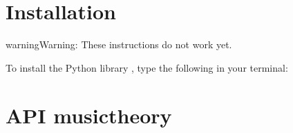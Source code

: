 \documentclass[letterpaper,10pt,english]{sphinxmanual}
\begin{document}
\cleardoublepage
\begingroup
\renewcommand\chapter[1]{\endgroup}


\chapter{Bibliography}
\label{\detokenize{8_bibliography:bibliography}}\label{\detokenize{8_bibliography::doc}}



\chapter{Developers}
\label{\detokenize{index:developers}}

\section{Installation}
\label{\detokenize{install:installation}}\label{\detokenize{install::doc}}
\begin{sphinxadmonition}{warning}{Warning:}
These instructions do not work yet.
\end{sphinxadmonition}

To install the Python library , type the following in your terminal:

\begin{sphinxVerbatim}[commandchars=\\\{\}]
  
\end{sphinxVerbatim}


\section{API \sphinxhyphen{} musictheory}
\label{\detokenize{api:module-musictheory}}\label{\detokenize{api:api-musictheory}}\label{\detokenize{api::doc}}
\end{document}
